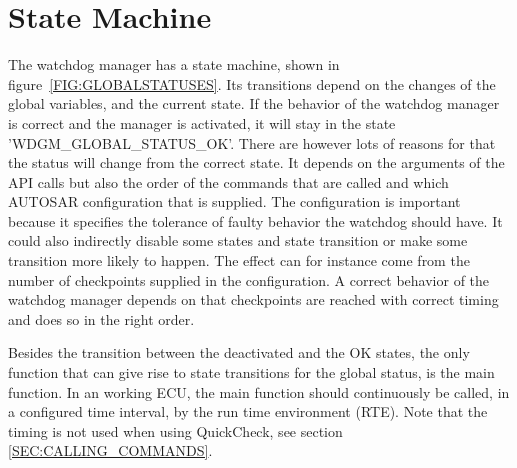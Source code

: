 
\section{State Machine}
The watchdog manager has a state machine, shown in
figure~\ref{FIG:GLOBALSTATUSES}. Its transitions depend on the changes of the
global variables, and the current state. If the behavior of the watchdog manager
is correct and the manager is activated, it will stay in the state
'WDGM\_GLOBAL\_STATUS\_OK'. There are however lots of reasons for that the
status will change from the correct state. It depends on the arguments of the
API calls but also the order of the commands that are called and which AUTOSAR
configuration that is supplied. The configuration is important because it
specifies the tolerance of faulty behavior the watchdog should have. It could
also indirectly disable some states and state transition or make some
transition more likely to happen. The effect can for instance come from the
number of checkpoints supplied in the configuration. A correct behavior of the
watchdog manager depends on that checkpoints are reached with correct timing
and does so in the right order.

Besides the transition between the deactivated and the OK states, the only
function that can give rise to state transitions for the global status, is the
main function. In an working ECU, the main function should continuously be
called, in a configured time interval, by the run time environment (RTE). Note
that the timing is not used when using QuickCheck, see section
\ref{SEC:CALLING_COMMANDS}.

